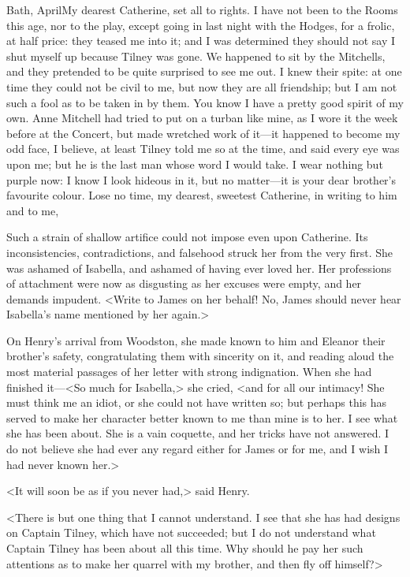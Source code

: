 \begin{mail}{Bath, April}{My dearest Catherine,}
set all to rights. I have not been to the Rooms this age, nor to the play, except going in last night with the Hodges, for a frolic, at half price: they teased me into it; and I was determined they should not say I shut myself up because Tilney was gone. We happened to sit by the Mitchells, and they pretended to be quite surprised to see me out. I knew their spite: at one time they could not be civil to me, but now they are all friendship; but I am not such a fool as to be taken in by them. You know I have a pretty good spirit of my own. Anne Mitchell had tried to put on a turban like mine, as I wore it the week before at the Concert, but made wretched work of it—it happened to become my odd face, I believe, at least Tilney told me so at the time, and said every eye was upon me; but he is the last man whose word I would take. I wear nothing but purple now: I know I look hideous in it, but no matter—it is your dear brother's favourite colour. Lose no time, my dearest, sweetest Catherine, in writing to him and to me,  
\end{mail}

 Such a strain of shallow artifice could not impose even upon Catherine. Its inconsistencies, contradictions, and falsehood struck her from the very first. She was ashamed of Isabella, and ashamed of having ever loved her. Her professions of attachment were now as disgusting as her excuses were empty, and her demands impudent. <Write to James on her behalf! No, James should never hear Isabella's name mentioned by her again.> 

 On Henry's arrival from Woodston, she made known to him and Eleanor their brother's safety, congratulating them with sincerity on it, and reading aloud the most material passages of her letter with strong indignation. When she had finished it—<So much for Isabella,> she cried, <and for all our intimacy! She must think me an idiot, or she could not have written so; but perhaps this has served to make her character better known to me than mine is to her. I see what she has been about. She is a vain coquette, and her tricks have not answered. I do not believe she had ever any regard either for James or for me, and I wish I had never known her.> 

 <It will soon be as if you never had,> said Henry. 

 <There is but one thing that I cannot understand. I see that she has had designs on Captain Tilney, which have not succeeded; but I do not understand what Captain Tilney has been about all this time. Why should he pay her such attentions as to make her quarrel with my brother, and then fly off himself?> 

